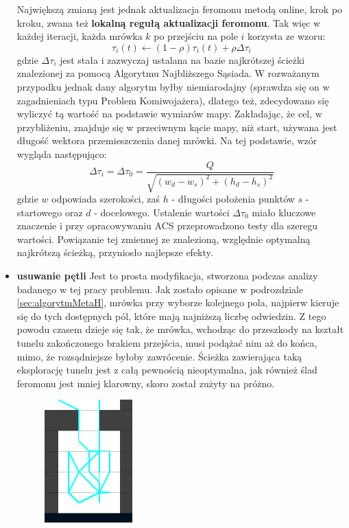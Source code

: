\documentclass[printmode, openany, oneside, eng]{mgr}
\begin{document}
\begin{itemize}
\newline Największą zmianą jest jednak aktualizacja feromonu metodą online, krok po kroku, zwana też \textbf{lokalną regułą aktualizacji feromonu}. Tak więc w każdej iteracji, każda mrówka $k$ po przejściu na pole $i$ korzysta ze wzoru: 
\newline
\begin{equation}
\tau_{i}(t)  \leftarrow (1-\rho)\tau_{i}(t) + \rho \Delta \tau_i
\end{equation}
\newline
gdzie $\Delta \tau_i$ jest stała i zazwyczaj ustalana na bazie najkrótszej ścieżki znalezionej za pomocą Algorytmu Najbliższego Sąsiada. W rozważanym przypadku jednak dany algorytm byłby niemiarodajny (sprawdza się on w zagadnieniach typu Problem Komiwojażera), dlatego też, zdecydowano się wyliczyć tą wartość na podstawie wymiarów mapy. Zakładając, że cel, w przybliżeniu, znajduje się w przeciwnym kącie mapy, niż start, używana jest długość wektora przemieszczenia danej mrówki. Na tej podstawie, wzór wygląda następująco:
\begin{equation}
\Delta \tau_i = \Delta \tau_0 = \frac{Q}{\sqrt{(w_d - w_s)^2 + (h_d - h_s)^2}} 
\end{equation}
\newline
gdzie $w$ odpowiada szerokości, zaś $h$ - długości położenia punktów $s$ - startowego oraz $d$ - docelowego. Ustalenie wartości $\Delta \tau_0$ miało kluczowe znaczenie i przy opracowywaniu ACS przeprowadzono testy dla szeregu wartości. Powiązanie tej zmiennej ze znalezioną, względnie optymalną najkrótszą ścieżką, przyniosło najlepsze efekty.
\item \textbf{usuwanie pętli}
\newline Jest to prosta modyfikacja, stworzona podczas analizy badanego w tej pracy problemu. Jak zostało opisane w podrozdziale \ref{sec:algorytmMetaH}, mrówka przy wyborze kolejnego pola, najpierw kieruje się do tych dostępnych pól, które mają najniższą liczbę odwiedzin. Z tego powodu czasem dzieje się tak, że mrówka, wchodząc do przeszkody na kształt tunelu zakończonego brakiem przejścia, musi podążać nim aż do końca, mimo, że rozsądniejsze byłoby zawrócenie. Ścieżka zawierająca taką eksplorację tunelu jest z całą pewnością nieoptymalna, jak również ślad feromonu jest mniej klarowny, skoro został zużyty na próżno.
\begin{figure}[H]
\centering
\includegraphics[scale=1]{img/02pomieszczenie.png}

\end{figure}
\end{itemize}
\end{document}
